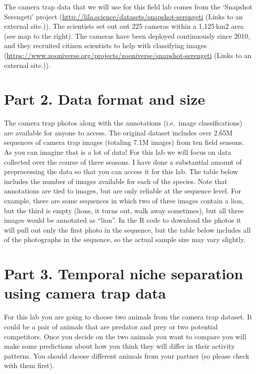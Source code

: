 \documentclass[]{book}
\begin{document}
The camera trap data that we will use for this field lab comes from the `Snapshot Serengeti' project (\url{http://lila.science/datasets/snapshot-serengeti} (Links to an external site.)). The scientists set out out 225 cameras within a 1,125 km2 area (see map to the right). The cameras have been deployed continuously since 2010, and they recruited citizen scientists to help with classifying images (\url{https://www.zooniverse.org/projects/zooniverse/snapshot-serengeti} (Links to an external site.)).

\hypertarget{part-2.-data-format-and-size}{%
\section*{Part 2. Data format and size}\label{part-2.-data-format-and-size}}

The camera trap photos along with the annotations (i.e.~image classifications) are available for anyone to access. The original dataset includes over 2.65M sequences of camera trap images (totaling 7.1M images) from ten field seasons. As you can imagine that is a lot of data! For this lab we will focus on data collected over the course of three seasons. I have done a substantial amount of preprocessing the data so that you can access it for this lab. The table below includes the number of images available for each of the species. Note that annotations are tied to images, but are only reliable at the sequence level. For example, there are some sequences in which two of three images contain a lion, but the third is empty (lions, it turns out, walk away sometimes), but all three images would be annotated as ``lion''. In the R code to download the photos it will pull out only the first photo in the sequence, but the table below includes all of the photographs in the sequence, so the actual sample size may vary slightly.

\hypertarget{part-3.-temporal-niche-separation-using-camera-trap-data}{%
\section*{Part 3. Temporal niche separation using camera trap data}\label{part-3.-temporal-niche-separation-using-camera-trap-data}}

For this lab you are going to choose two animals from the camera trap dataset. It could be a pair of animals that are predator and prey or two potential competitors. Once you decide on the two animals you want to compare you will make some predictions about how you think they will differ in their activity patterns. You should choose different animals from your partner (so please check with them first).
\end{document}
